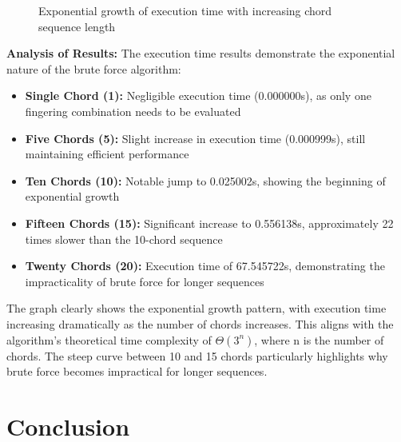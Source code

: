 \documentclass[conference]{IEEEtran}
\begin{document}
\begin{figure}[H]
\caption{Exponential growth of execution time with increasing chord sequence length}
\label{fig:luismiguel_bf_graph}
\end{figure}

\textbf{Analysis of Results:}
The execution time results demonstrate the exponential nature of the brute force algorithm:

\begin{itemize}
    \item \textbf{Single Chord (1):} Negligible execution time (0.000000s), as only one fingering combination needs to be evaluated
    \item \textbf{Five Chords (5):} Slight increase in execution time (0.000999s), still maintaining efficient performance
    \item \textbf{Ten Chords (10):} Notable jump to 0.025002s, showing the beginning of exponential growth
    \item \textbf{Fifteen Chords (15):} Significant increase to 0.556138s, approximately 22 times slower than the 10-chord sequence
    \item \textbf{Twenty Chords (20):} Execution time of 67.545722s, demonstrating the impracticality of brute force for longer sequences
\end{itemize}

The graph clearly shows the exponential growth pattern, with execution time increasing dramatically as the number of chords increases. This aligns with the algorithm's theoretical time complexity of \(\Theta(3^n)\), where n is the number of chords. The steep curve between 10 and 15 chords particularly highlights why brute force becomes impractical for longer sequences.

\section{Conclusion}



\end{document}
